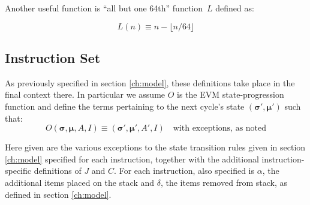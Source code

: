 \documentclass[9pt,oneside]{amsart}
\begin{document}
Another useful function is ``all but one 64th'' function~$L$ defined as:

\begin{equation}
L(n) \equiv n - \lfloor n / 64 \rfloor
\end{equation}

\subsection{Instruction Set}

As previously specified in section \ref{ch:model}, these definitions take place in the final context there. In particular we assume $O$ is the EVM state-progression function and define the terms pertaining to the next cycle's state $(\boldsymbol{\sigma}', \boldsymbol{\mu}')$ such that:
\begin{equation}
O(\boldsymbol{\sigma}, \boldsymbol{\mu}, A, I) \equiv (\boldsymbol{\sigma}', \boldsymbol{\mu}', A', I) \quad \text{with exceptions, as noted}
\end{equation}

Here given are the various exceptions to the state transition rules given in section \ref{ch:model} specified for each instruction, together with the additional instruction-specific definitions of $J$ and $C$. For each instruction, also specified is $\alpha$, the additional items placed on the stack and $\delta$, the items removed from stack, as defined in section \ref{ch:model}.
\end{document}

